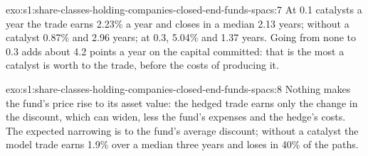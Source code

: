 \begin{solution}{exo:s1:share-classes-holding-companies-closed-end-funds-spacs:7}
At 0.1 catalysts a year the trade earns 2.23\% a year and closes in a median 2.13 years; without a catalyst 0.87\% and 2.96 years; at 0.3, 5.04\% and 1.37
years. Going from none to 0.3 adds about 4.2 points a year on the capital committed: that is the most a catalyst is worth to the trade, before the costs of
producing it.
\end{solution}

\begin{solution}{exo:s1:share-classes-holding-companies-closed-end-funds-spacs:8}
Nothing makes the fund's price rise to its asset value: the hedged trade earns only the change in the discount, which can widen, less the fund's expenses and
the hedge's costs. The expected narrowing is to the fund's average discount; without a catalyst the model trade earns 1.9\% over a median three years and
loses in 40\% of the paths.
\end{solution}

